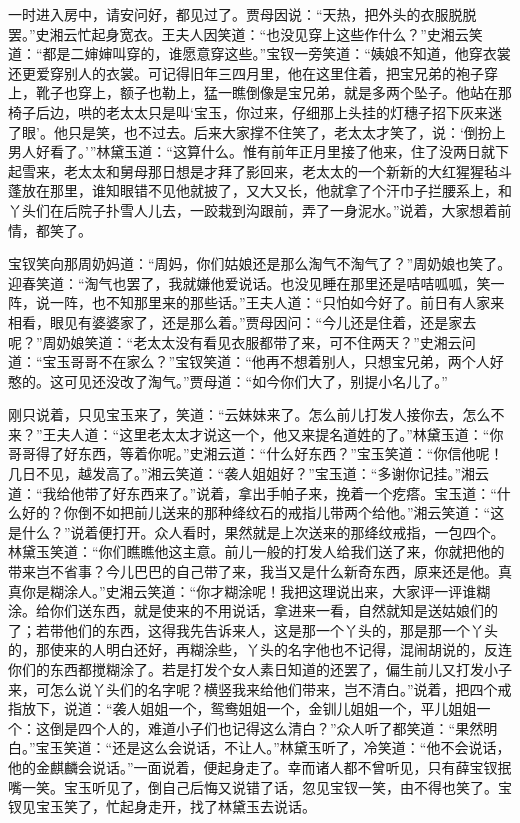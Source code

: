 一时进入房中，请安问好，都见过了。贾母因说：``天热，把外头的衣服脱脱罢。''史湘云忙起身宽衣。王夫人因笑道：``也没见穿上这些作什么？''史湘云笑道：``都是二婶婶叫穿的，谁愿意穿这些。''宝钗一旁笑道：``姨娘不知道，他穿衣裳还更爱穿别人的衣裳。可记得旧年三四月里，他在这里住着，把宝兄弟的袍子穿上，靴子也穿上，额子也勒上，猛一瞧倒像是宝兄弟，就是多两个坠子。他站在那椅子后边，哄的老太太只是叫`宝玉，你过来，仔细那上头挂的灯穗子招下灰来迷了眼'。他只是笑，也不过去。后来大家撑不住笑了，老太太才笑了，说：`倒扮上男人好看了。'''林黛玉道：``这算什么。惟有前年正月里接了他来，住了没两日就下起雪来，老太太和舅母那日想是才拜了影回来，老太太的一个新新的大红猩猩毡斗蓬放在那里，谁知眼错不见他就披了，又大又长，他就拿了个汗巾子拦腰系上，和丫头们在后院子扑雪人儿去，一跤栽到沟跟前，弄了一身泥水。''说着，大家想着前情，都笑了。

宝钗笑向那周奶妈道：``周妈，你们姑娘还是那么淘气不淘气了？''周奶娘也笑了。迎春笑道：``淘气也罢了，我就嫌他爱说话。也没见睡在那里还是咭咭呱呱，笑一阵，说一阵，也不知那里来的那些话。''王夫人道：``只怕如今好了。前日有人家来相看，眼见有婆婆家了，还是那么着。''贾母因问：``今儿还是住着，还是家去呢？''周奶娘笑道：``老太太没有看见衣服都带了来，可不住两天？''史湘云问道：``宝玉哥哥不在家么？''宝钗笑道：``他再不想着别人，只想宝兄弟，两个人好憨的。这可见还没改了淘气。''贾母道：``如今你们大了，别提小名儿了。''

刚只说着，只见宝玉来了，笑道：``云妹妹来了。怎么前儿打发人接你去，怎么不来？''王夫人道：``这里老太太才说这一个，他又来提名道姓的了。''林黛玉道：``你哥哥得了好东西，等着你呢。''史湘云道：``什么好东西？''宝玉笑道：``你信他呢！几日不见，越发高了。''湘云笑道：``袭人姐姐好？''宝玉道：``多谢你记挂。''湘云道：``我给他带了好东西来了。''说着，拿出手帕子来，挽着一个疙瘩。宝玉道：``什么好的？你倒不如把前儿送来的那种绛纹石的戒指儿带两个给他。''湘云笑道：``这是什么？''说着便打开。众人看时，果然就是上次送来的那绛纹戒指，一包四个。林黛玉笑道：``你们瞧瞧他这主意。前儿一般的打发人给我们送了来，你就把他的带来岂不省事？今儿巴巴的自己带了来，我当又是什么新奇东西，原来还是他。真真你是糊涂人。''史湘云笑道：``你才糊涂呢！我把这理说出来，大家评一评谁糊涂。给你们送东西，就是使来的不用说话，拿进来一看，自然就知是送姑娘们的了；若带他们的东西，这得我先告诉来人，这是那一个丫头的，那是那一个丫头的，那使来的人明白还好，再糊涂些，丫头的名字他也不记得，混闹胡说的，反连你们的东西都搅糊涂了。若是打发个女人素日知道的还罢了，偏生前儿又打发小子来，可怎么说丫头们的名字呢？横竖我来给他们带来，岂不清白。''说着，把四个戒指放下，说道：``袭人姐姐一个，鸳鸯姐姐一个，金钏儿姐姐一个，平儿姐姐一个：这倒是四个人的，难道小子们也记得这么清白？''众人听了都笑道：``果然明白。''宝玉笑道：``还是这么会说话，不让人。''林黛玉听了，冷笑道：``他不会说话，他的金麒麟会说话。''一面说着，便起身走了。幸而诸人都不曾听见，只有薛宝钗抿嘴一笑。宝玉听见了，倒自己后悔又说错了话，忽见宝钗一笑，由不得也笑了。宝钗见宝玉笑了，忙起身走开，找了林黛玉去说话。

